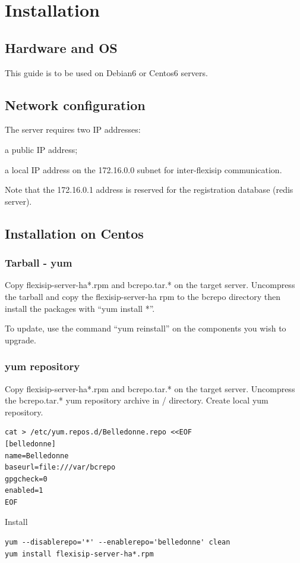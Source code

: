 \documentclass[a4paper,10pt]{article}
\begin{document}
\section{Installation}
\subsection{Hardware and OS}
This guide is to be used on Debian6 or Centos6 servers.


\subsection{Network configuration}
The server requires two IP addresses:
\begin{itemize*}
 \item a public IP address;
 \item a local IP address on the 172.16.0.0 subnet for inter-flexisip communication.
\end{itemize*}

Note that the 172.16.0.1 address is reserved for the registration database (redis server).


\subsection{Installation on Centos}
\subsubsection{Tarball - yum}
Copy flexisip-server-ha*.rpm and  bcrepo.tar.* on the target server.
Uncompress the tarball and copy the flexisip-server-ha rpm to the bcrepo directory then install the packages with “yum install *”.


To update, use the command “yum reinstall” on the components you wish to upgrade.


\subsubsection{yum repository}
Copy flexisip-server-ha*.rpm and  bcrepo.tar.* on the target server.
Uncompress the bcrepo.tar.* yum repository archive in / directory.
Create local yum repository.
\begin{verbatim}
cat > /etc/yum.repos.d/Belledonne.repo <<EOF
[belledonne]
name=Belledonne
baseurl=file:///var/bcrepo
gpgcheck=0
enabled=1
EOF
\end{verbatim}

Install
\begin{verbatim}
yum --disablerepo='*' --enablerepo='belledonne' clean
yum install flexisip-server-ha*.rpm
\end{verbatim}
\end{document}
